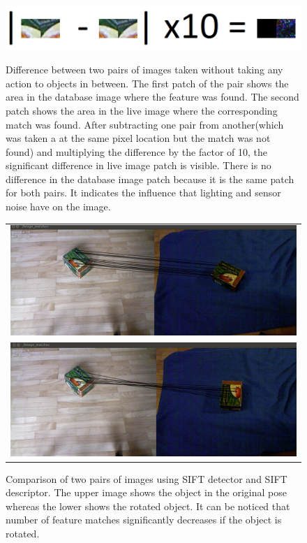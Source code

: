 \begin{figure}

{\includegraphics[width=1\columnwidth]{figures/patches.png}}

\caption{Difference between two pairs of images taken without taking any action to objects in between. The first patch of the pair shows the area in the database image where the feature was found. The second patch shows the area in the live image where the corresponding match was found. After subtracting one pair from another(which was taken a at the same pixel location but the match was not found) and multiplying the difference by the factor of 10, the significant difference in live image patch is visible. There is no difference in the database image patch because it is the same patch for both pairs.  It indicates the influence that lighting and sensor noise have on the image. }
\label{fig:patches}
\end{figure}

\begin{figure}
    \begin{tabular}{c}
 

\includegraphics[width=0.7\columnwidth]{figures/sift-gpu-no-rotation.png}\\
\includegraphics[width=0.7\columnwidth]{figures/siftgpu-rotation.png}\\
    \end{tabular}


\caption{Comparison of two pairs of images using SIFT detector and SIFT descriptor. The upper image shows the object in the original pose whereas the lower shows the rotated object. It can be noticed that number of feature matches significantly decreases if the object is rotated. }
\label{fig:sift-features}
\end{figure}

